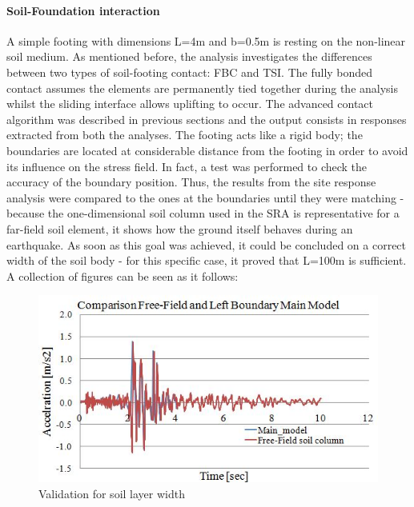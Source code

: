 \paragraph{Soil-Foundation interaction}
A simple footing with dimensions L=4m and b=0.5m is resting on the non-linear soil medium. As mentioned before, the analysis investigates the differences between two types of soil-footing contact: FBC and TSI. The fully bonded contact assumes the elements are permanently tied together during the analysis whilst the sliding interface allows uplifting to occur. The advanced contact algorithm was described in previous sections and the output consists in responses extracted from both the analyses. The footing acts like a rigid body; the boundaries are located at considerable distance from the footing in order to avoid its influence on the stress field. In fact, a test was performed to check the accuracy of the boundary position. Thus, the results from the site response analysis were compared to the ones at the boundaries until they were matching - because the one-dimensional soil column used in the SRA is representative for a far-field soil element, it shows how the ground itself behaves during an earthquake. As soon as this goal was achieved, it could be concluded on a correct width of the soil body - for this specific case, it proved that L=100m is sufficient. A collection of figures can be seen as it follows:

	\begin{figure}[!h]
		\centering
		\includegraphics[width=0.7\linewidth]{"free-field2"}
		\caption{Validation for soil layer width}
		\label{validation}
	\end{figure}

